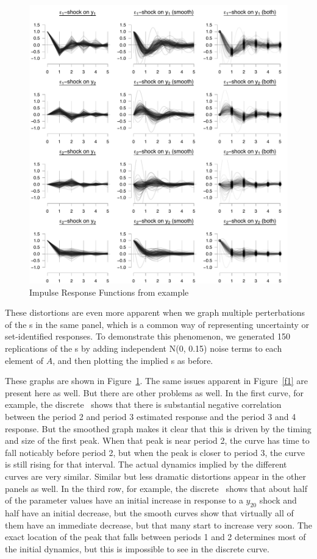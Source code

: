 \documentclass[12pt,fleqn]{article}
\begin{document}
\begin{figure}[t]
  \centering
  \includegraphics{graphs/numeric2.pdf}
  \caption{Impulse Response Functions from example}
  \label{f2}
\end{figure}

These distortions are even more apparent when we graph multiple
perterbations of the \IRF s in the same panel, which is a common way
of representing uncertainty or set-identified responses. To
demonstrate this phenomenon, we generated 150 replications of the \IRF
s by adding independent N(0, 0.15) noise terms to each element of $A$,
and then plotting the implied \IRF s as before.

These graphs are shown in Figure~\ref{f2}. The same issues apparent in
Figure~\ref{f1} are present here as well. But there are other problems
as well. In the first curve, for example, the discrete \IRF\ shows
that there is substantial negative correlation between the period 2
and period 3 estimated response and the period 3 and 4 response. But
the smoothed graph makes it clear that this is driven by the timing
and size of the first peak. When that peak is near period 2, the curve
has time to fall noticably before period 2, but when the peak is
closer to period 3, the curve is still rising for that interval. The
actual dynamics implied by the different curves are very
similar. Similar but less dramatic distortions appear in the other
panels as well. In the third row, for example, the discrete \IRF\
shows that about half of the parameter values have an initial increase
in response to a $y_{20}$ shock and half have an initial decrease, but
the smooth curves show that virtually all of them have an immediate
decrease, but that many start to increase very soon. The exact
location of the peak that falls between periods 1 and 2 determines
most of the initial dynamics, but this is impossible to see in the
discrete curve.
\end{document}
